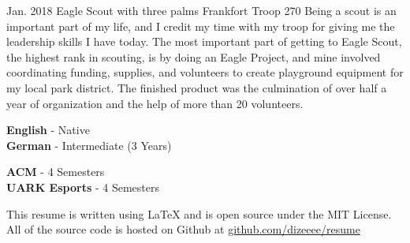 \documentclass[9pt]{developercv} %
\begin{document}

\begin{entrylist}
	\entry
		{Jan. 2018}
		{Eagle Scout with three palms}
		{Frankfort Troop 270}
		{Being a scout is an important part of my life, and I credit my time with my troop for giving me the leadership skills I have today. The most important part of getting to Eagle Scout, the highest rank in scouting, is by doing an Eagle Project, and mine involved coordinating funding, supplies, and volunteers to create playground equipment for my local park district. The finished product was the culmination of over half a year of organization and the help of more than 20 volunteers.}
\end{entrylist}

\begin{minipage}[t]{0.3\textwidth}
	\vspace{-\baselineskip} %

	
	\textbf{English} - Native\\
	\textbf{German} - Intermediate (3 Years)\\
\end{minipage}
\hfill
\begin{minipage}[t]{0.25\textwidth}
	\vspace{-\baselineskip} %
	
	
	\textbf{ACM} - 4 Semesters\\
	\textbf{UARK Esports} - 4 Semesters\\
\end{minipage}
\hfill
\begin{minipage}[t]{0.4\textwidth}
	\vspace{-\baselineskip} %
	
	
	This resume is written using LaTeX and is open source under the MIT License. All of the source code is hosted on Github at \href{https://www.github.com/Dizeeee/resume}{github.com/dizeeee/resume}
\end{minipage}

\end{document}
